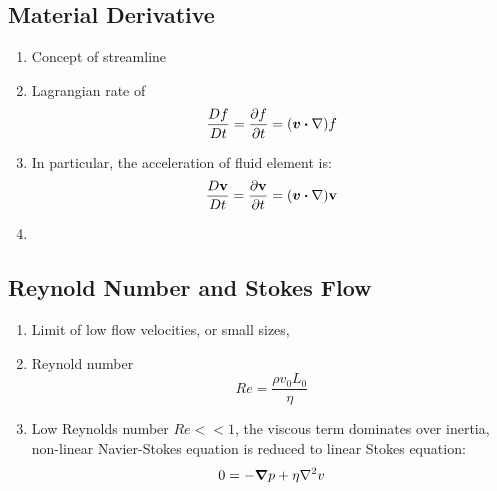 \documentclass[12pt,a4paper]{article}
\begin{document}
        \subsection{Material Derivative}
            \begin{enumerate}
                \item Concept of streamline
                \item Lagrangian rate of 
                \begin{equation}
                    \frac{Df}{Dt} = \pdv{f}{t} = (\vb*{v} \dotproduct \vb{\nabla})f
                \end{equation}
                \item In particular, the acceleration of fluid element is:
                \begin{equation}
                    \frac{D\vb{v}}{Dt} = \pdv{\vb{v}}{t} = (\vb*{v} \dotproduct \vb{\nabla})\vb{v}
                \end{equation}
                \item 
            \end{enumerate}
        \subsection{Reynold Number and Stokes Flow}
            \begin{enumerate}
                \item Limit of low flow velocities, or small sizes, 
                \item Reynold number 
                \begin{equation}
                    Re =\frac{\rho v_0 L_0}{\eta}
                \end{equation}
                \item Low Reynolds number $Re << 1$, the viscous term dominates over inertia, non-linear Navier-Stokes equation is reduced to linear Stokes equation:
                \begin{equation}
                    0 = -\grad p +\eta\laplacian {v}
                \end{equation}
            \end{enumerate}
\end{document}
